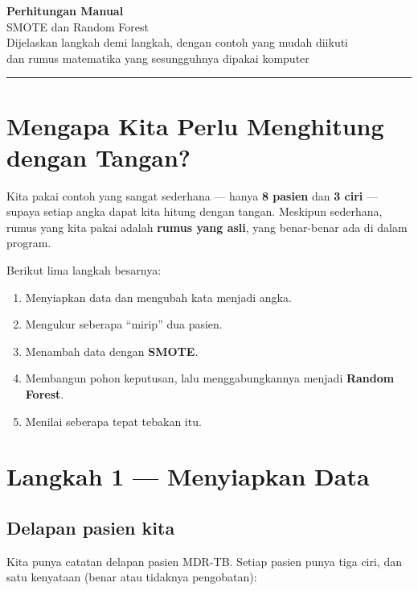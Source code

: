 \documentclass[11pt,a4paper]{article}
\begin{document}
\begin{center}
{\LARGE\bfseries\color{biru} Perhitungan Manual}\\[4pt]
{\large SMOTE dan Random Forest}\\[2pt]
{\normalsize\color{gray} Dijelaskan langkah demi langkah, dengan contoh yang mudah diikuti}\\[2pt]
{\normalsize\color{gray} dan rumus matematika yang sesungguhnya dipakai komputer}
\end{center}

\vspace{4pt}
\hrule
\vspace{10pt}

\section{Mengapa Kita Perlu Menghitung dengan Tangan?}

Kita pakai contoh yang sangat sederhana --- hanya \textbf{8 pasien} dan \textbf{3 ciri} ---
supaya setiap angka dapat kita hitung dengan tangan. Meskipun sederhana, rumus yang kita pakai
adalah \textbf{rumus yang asli}, yang benar-benar ada di dalam program.

Berikut lima langkah besarnya:
\begin{enumerate}[label=\textbf{Langkah \arabic*.}, leftmargin=*]
  \item Menyiapkan data dan mengubah kata menjadi angka.
  \item Mengukur seberapa ``mirip'' dua pasien.
  \item Menambah data dengan \textbf{SMOTE}.
  \item Membangun pohon keputusan, lalu menggabungkannya menjadi \textbf{Random Forest}.
  \item Menilai seberapa tepat tebakan itu.
\end{enumerate}

\section{Langkah 1 --- Menyiapkan Data}

\subsection{Delapan pasien kita}

Kita punya catatan delapan pasien MDR-TB. Setiap pasien punya tiga ciri, dan satu kenyataan
(benar atau tidaknya pengobatan):
\end{document}

